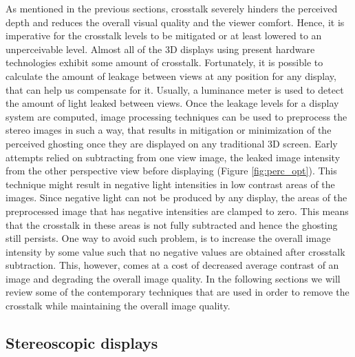 As mentioned in the previous sections, crosstalk severely hinders the perceived depth and reduces the overall visual quality and the viewer comfort. Hence, it is imperative for the crosstalk levels to be mitigated or at least lowered to an unperceivable level. Almost all of the 3D displays using present hardware technologies exhibit some amount of crosstalk. Fortunately, it is possible to calculate the amount of leakage between views at any position for any display, that can help us compensate for it. Usually, a luminance meter is used to detect the amount of light leaked between views. Once the leakage levels for a display system are computed, image processing techniques can be used to preprocess the stereo images in such a way, that results in mitigation or minimization of the perceived ghosting once they are displayed on any traditional 3D screen. Early attempts relied on subtracting from one view image, the leaked image intensity from the other perspective view before displaying (Figure \ref{fig:perc_opt}). This technique might result in  negative light intensities in low contrast areas of the images. Since negative light can not be produced by any display, the areas of the preprocessed image that has negative intensities are clamped to zero. This means that the crosstalk in these areas is not fully subtracted and hence the ghosting still persists. One way to avoid such problem, is to increase the overall image intensity by some value such that no negative values are obtained after crosstalk subtraction. This, however, comes at a cost of decreased average contrast of an image and degrading the overall image quality. In the following sections we will review some of the contemporary techniques that are used in order to remove the crosstalk while maintaining the overall image quality.

\subsection{Stereoscopic displays}

